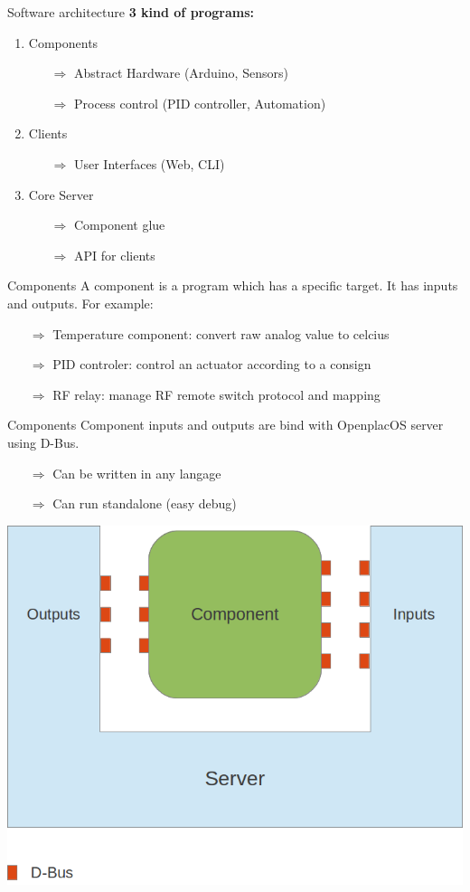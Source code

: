 \documentclass{beamer}
\begin{document}
\begin{frame}{Software architecture}
\textbf{3 kind of programs:}
\begin{enumerate}
\item Components
\begin{itemize}
\item[$\Rightarrow$] Abstract Hardware (Arduino, Sensors)
\item[$\Rightarrow$] Process control (PID controller, Automation)
\end{itemize}
\item Clients
\begin{itemize}
\item[$\Rightarrow$] User Interfaces (Web, CLI)
\end{itemize}
\item Core Server
\begin{itemize}
\item[$\Rightarrow$] Component glue
\item[$\Rightarrow$] API for clients
\end{itemize}

\end{enumerate}


\end{frame}

\begin{frame}{Components}
A component is a program which has a specific target. It has inputs and outputs. For example:
\begin{itemize}
\item[$\Rightarrow$] Temperature component: convert raw analog value to celcius
\item[$\Rightarrow$] PID controler: control an actuator according to a consign
\item[$\Rightarrow$] RF relay: manage RF remote switch protocol and mapping
\end{itemize}

\end{frame}
\begin{frame}{Components}
Component inputs and outputs are bind with OpenplacOS server using D-Bus. 
 \begin{itemize}
\item[$\Rightarrow$] Can be written in any langage
\item[$\Rightarrow$] Can run standalone (easy debug)
\end{itemize}
\begin{center} 
\includegraphics[width=0.6\columnwidth]{./figures/component.png}
\end{center}
\end{frame}
\end{document}
